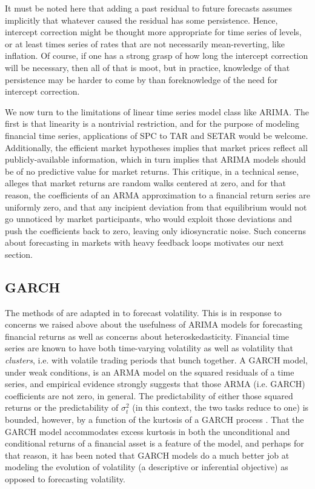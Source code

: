 \documentclass[11pt]{article}
\theoremstyle{definition}
\begin{document}
It must be noted here that adding a past residual to future forecasts assumes implicitly that whatever caused the residual has some persistence.  Hence, intercept correction might be thought more appropriate for time series of levels, or at least times series of rates that are not necessarily mean-reverting, like inflation.  Of course, if one has a strong grasp of how long the intercept correction will be necessary, then all of that is moot, but in practice, knowledge of that persistence may be harder to come by than foreknowledge of the need for intercept correction. 

We now turn to the limitations of linear time series model class like ARIMA.  The first is that linearity is a nontrivial restriction, and for the purpose of modeling financial time series, applications of SPC to TAR and SETAR would be welcome.  Additionally, the efficient market hypotheses implies that market prices reflect all publicly-available information, which in turn implies that ARIMA models should be of no predictive value for market returns.  This critique, in a technical sense, alleges that market returns are random walks centered at zero, and for that reason, the coefficients of an ARMA approximation to a financial return series are uniformly zero, and that any incipient deviation from that equilibrium would not go unnoticed by market participants, who would exploit those deviations and push the coefficients back to zero, leaving only idiosyncratic noise.  Such concerns about forecasting in markets with heavy feedback loops motivates our next section.
\subsection{GARCH}
The methods of \cite{lin2021minimizing} are adapted in \cite{lundquist2024volatility} to forecast volatility.  This is in response to concerns we raised above about the usefulness of ARIMA models for forecasting financial returns as well as concerns about heteroskedasticity.  Financial time series are known to have both time-varying volatility as well as  volatility that \textit{clusters}, i.e. with volatile trading periods that bunch together.  A GARCH model, under weak conditions, is an ARMA model on the squared residuals of a time series, and empirical evidence strongly suggests that those ARMA (i.e. GARCH) coefficients are not zero, in general.  The predictability of either those squared returns or the predictability of $\sigma_{t}^{2}$ (in this context, the two tasks reduce to one) is bounded, however, by a function of the kurtosis of a GARCH process \citep{francq2019garch}.  That the GARCH model accommodates excess kurtosis in both the unconditional and conditional returns of a financial asset is a feature of the model, and perhaps for that reason, it has been noted that GARCH models do a much better job at modeling the evolution of volatility (a descriptive or inferential objective) as opposed to forecasting volatility.
\end{document}
